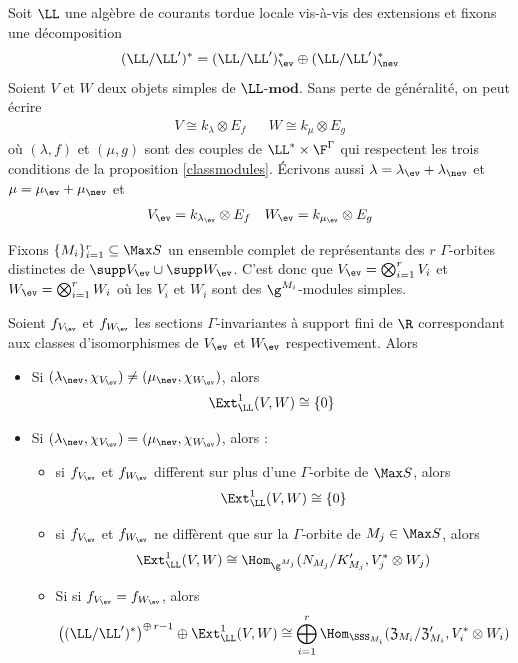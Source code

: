 \begin{Thm} \label{thmultime} Soit $\LL$ une algèbre de courants tordue locale vis-à-vis des extensions et fixons une décomposition 
$$ (\LL/\LL')^* = (\LL/\LL')_{\ev}^* \oplus (\LL/\LL')_{\nev}^* $$
Soient $V$ et $W$ deux objets simples de $\LL$-$\mathbf{mod}$. Sans perte de généralité, on peut écrire 
\begin{align*} 
V \cong k_\lambda \otimes E_f && W \cong k_\mu \otimes E_g
\end{align*}
où $(\lambda,f)$ et $(\mu,g)$ sont des couples de $\LL^* \times \F^\Gamma$ qui respectent les trois conditions de la proposition \ref{classmodules}. Écrivons aussi $\lambda = \lambda_{\ev} + \lambda_{\nev}$ et $\mu = \mu_{\ev} + \mu_{\nev}$ et
\begin{align*} 
V_{\ev} = k_{\lambda_{\ev}} \otimes E_f && W_{\ev} = k_{\mu_{\ev}} \otimes E_g
\end{align*}

Fixons $\{M_i\}_{i=1}^r \subseteq \Max S$ un ensemble complet de représentants des $r$ $\Gamma$-orbites distinctes de $\supp V_{\ev} \cup \supp W_{\ev}$. C'est donc que $V_{\ev} = \bigotimes_{i=1}^r V_i$ et  $W_{\ev} = \bigotimes_{i=1}^r W_i$ où les $V_i$ et $W_i$ sont des $\g^{M_i}$-modules simples. 

Soient $f_{V_{\ev}}$ et $f_{W_{\ev}}$ les sections $\Gamma$-invariantes à support fini de $\R$ correspondant aux classes d'isomorphismes de $V_{\ev}$ et $W_{\ev}$ respectivement. Alors

\begin{itemize}
\item[\em(i)] Si $(\lambda_{\nev},\chi_{V_{\ev}}) \neq (\mu_{\nev},\chi_{W_{\ev}})$, alors 
$$ \Ext_\LL^1(V,W) \cong \{0\} $$
\item[\em(ii)] Si $(\lambda_{\nev},\chi_{V_{\ev}}) = (\mu_{\nev},\chi_{W_{\ev}})$, alors :

\begin{itemize}
\item[\em(1)] si $f_{V_{\ev}}$ et $f_{W_{\ev}}$ diff\`erent sur plus d'une $\Gamma$-orbite de $\Max S$, alors 
$$ \Ext_\LL^1(V,W) \cong \{0\} $$
\item[\em(2)] si $f_{V_{\ev}}$ et $f_{W_{\ev}}$ ne diff\`erent que sur la $\Gamma$-orbite de $M_j \in \Max S$, alors 
$$ \Ext_\LL^1(V,W) \cong \Hom_{\g^{M_j}}(N_{M_j}/K_{M_j}',V_j^* \otimes W_j) $$
\item[\em(3)] Si si $f_{V_{\ev}} = f_{W_{\ev}}$, alors 
$$ \big((\LL/\LL')^*\big)^{\oplus\,r-1} \oplus \Ext_\LL^1(V,W) \cong \bigoplus_{i=1}^r \Hom_{\SSS_{M_i}}(\mathfrak{Z}_{M_i}/\mathfrak{Z}_{M_i}',V_i^* \otimes W_i) $$
\end{itemize}
\end{itemize}
\end{Thm}

